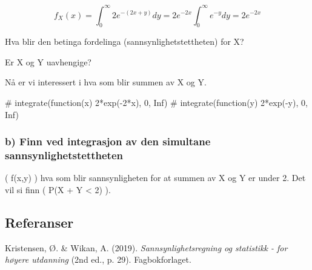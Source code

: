 \documentclass[
  12pt,
  a4paper,
  DIV=11,
  numbers=noendperiod]{scrartcl}
\newenvironment{Shaded}{\begin{snugshade}}{\end{snugshade}}
\newcommand{\CommentTok}[1]{\textcolor[rgb]{0.37,0.37,0.37}{#1}}
\newlength{\cslhangindent}
\newenvironment{CSLReferences}[2] %
 {\begin{list}{}{%
  \setlength{\itemindent}{0pt}
  \setlength{\leftmargin}{0pt}
  \setlength{\parsep}{0pt}
  \ifodd #1
   \setlength{\leftmargin}{\cslhangindent}
   \setlength{\itemindent}{-1\cslhangindent}
  \fi
  \setlength{\itemsep}{#2\baselineskip}}}
 {\end{list}}
\begin{document}
\[ f_X(x) = \int_0^\infty 2e^{-(2x+y)} dy = 2e^{-2x} \int_0^\infty e^{-y} dy = 2e^{-2x} \]

Hva blir den betinga fordelinga (sannsynlighetstettheten) for X?

Er X og Y uavhengige?

Nå er vi interessert i hva som blir summen av X og Y.

\begin{Shaded}
\begin{Highlighting}[]
\CommentTok{\# integrate(function(x) 2*exp({-}2*x), 0, Inf)}
\CommentTok{\# integrate(function(y) 2*exp({-}y), 0, Inf)}
\end{Highlighting}
\end{Shaded}

\subsubsection{b) Finn ved integrasjon av den simultane
sannsynlighetstettheten}\label{b-finn-ved-integrasjon-av-den-simultane-sannsynlighetstettheten}

( f(x,y) ) hva som blir sannsynligheten for at summen av X og Y er under
2. Det vil si finn ( P(X + Y \textless{} 2) ).

\clearpage

\subsection{Referanser}\label{referanser}

\label{refs}
\begin{CSLReferences}{1}{0}
Kristensen, Ø. \& Wikan, A. (2019). \emph{Sannsynlighetsregning og
statistikk - for høyere utdanning} (2nd ed., p. 29). Fagbokforlaget.

\end{CSLReferences}
\end{document}
